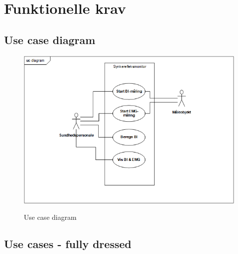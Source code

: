 \documentclass[main.tex]{subfiles}
\begin{document}
\section{Funktionelle krav}
\subsection{Use case diagram}

\begin{figure}[H]
\centering
{\includegraphics[width=\textwidth]
{Figure/usecasediagram}}
\caption{Use case diagram}
\label{Use case diagram}
\end{figure}

\subsection{Use cases - fully dressed}
\end{document}
